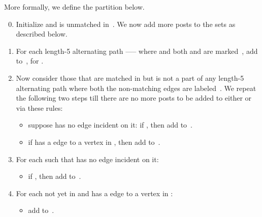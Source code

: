 \documentclass[11pt]{llncs}
\begin{document}
More formally, we define the partition  below.
\begin{enumerate}\setcounter{enumi}{-1}
\item Initialize  and  is unmatched in~.
We now add more posts to the sets  as described below.

\item 
For each length-5 alternating path ----- where 
 and both  and  are marked~, 
add  to~, for .

\item Now consider those  that are matched in  but  is not a part of any 
length-5 alternating path where both the non-matching edges are labeled~. We repeat the 
following two steps till there are no more posts to be added to either  or~
via these rules: 
\begin{itemize}
\item suppose  has no  edge incident on it: if , then add 
 to~. 
\item if  has a  edge to a vertex in , then add  to~. 
\end{itemize}
\item For each  such that  has no  edge incident on it: 
\begin{itemize}
\item if , then add  to~. 
\end{itemize}
\item For each  not yet in  and  has a  edge to a vertex in : 
\begin{itemize}
\item add  to~. 
\end{itemize}
\end{enumerate}
\end{document}
